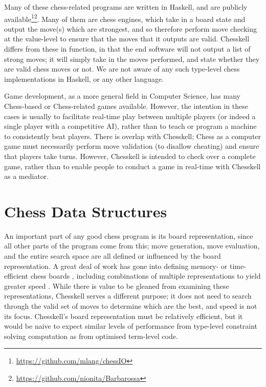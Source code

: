 \documentclass[12pt, a4paper, bibliography=totocnumbered]{scrreprt}
\begin{document}
Many of these chess-related programs are written in Haskell, and are publicly available\footnote{\url{https://github.com/mlang/chessIO}}\footnote{\url{https://github.com/nionita/Barbarossa}}. Many of them are chess engines, which take in a board state and output the move(s) which are strongest, and so therefore perform move checking at the value-level to ensure that the moves that it outputs are valid. Chesskell differs from these in function, in that the end software will not output a list of strong moves; it will simply take in the moves performed, and state whether they are valid chess moves or not. We are not aware of any such type-level chess implementations in Haskell, or any other language.

Game development, as a more general field in Computer Science, has many Chess-based or Chess-related games available. However, the intention in these cases is usually to facilitate real-time play between multiple players (or indeed a single player with a competitive AI), rather than to teach or program a machine to consistently beat players. There is overlap with Chesskell; Chess as a computer game must necessarily perform move validation (to disallow cheating) and ensure that players take turns. However, Chesskell is intended to check over a complete game, rather than to enable people to conduct a game in real-time with Chesskell as a mediator.

\section{Chess Data Structures}

An important part of any good chess program is its board representation, since all other parts of the program come from this; move generation, move evaluation, and the entire search space are all defined or influenced by the board representation. A great deal of work has gone into defining memory- or time-efficient chess boards \cite{bitboard} \cite{searchtables}, including combinations of multiple representations to yield greater speed \cite{bitandccr}. While there is value to be gleaned from examining these representations, Chesskell serves a different purpose; it does not need to search through the valid set of moves to determine which are the best, and speed is not its focus. Chesskell's board representation must be relatively efficient, but it would be naive to expect similar levels of performance from type-level constraint solving computation as from optimised term-level code.
\end{document}
